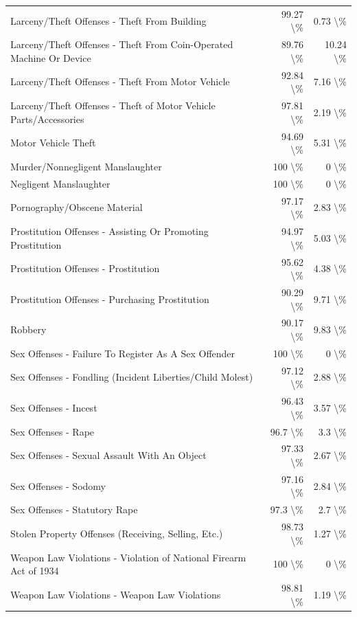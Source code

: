 \documentclass[
  12pt,
  openany]{book}
\begin{document}
\begin{longtable}[t]{lrr}
Larceny/Theft Offenses - Theft From Building & 99.27 \textbackslash{}\% & 0.73 \textbackslash{}\%\\
Larceny/Theft Offenses - Theft From Coin-Operated Machine Or Device & 89.76 \textbackslash{}\% & 10.24 \textbackslash{}\%\\
Larceny/Theft Offenses - Theft From Motor Vehicle & 92.84 \textbackslash{}\% & 7.16 \textbackslash{}\%\\
\addlinespace
Larceny/Theft Offenses - Theft of Motor Vehicle Parts/Accessories & 97.81 \textbackslash{}\% & 2.19 \textbackslash{}\%\\
Motor Vehicle Theft & 94.69 \textbackslash{}\% & 5.31 \textbackslash{}\%\\
Murder/Nonnegligent Manslaughter & 100 \textbackslash{}\% & 0 \textbackslash{}\%\\
Negligent Manslaughter & 100 \textbackslash{}\% & 0 \textbackslash{}\%\\
Pornography/Obscene Material & 97.17 \textbackslash{}\% & 2.83 \textbackslash{}\%\\
\addlinespace
Prostitution Offenses - Assisting Or Promoting Prostitution & 94.97 \textbackslash{}\% & 5.03 \textbackslash{}\%\\
Prostitution Offenses - Prostitution & 95.62 \textbackslash{}\% & 4.38 \textbackslash{}\%\\
Prostitution Offenses - Purchasing Prostitution & 90.29 \textbackslash{}\% & 9.71 \textbackslash{}\%\\
Robbery & 90.17 \textbackslash{}\% & 9.83 \textbackslash{}\%\\
Sex Offenses - Failure To Register As A Sex Offender & 100 \textbackslash{}\% & 0 \textbackslash{}\%\\
\addlinespace
Sex Offenses - Fondling (Incident Liberties/Child Molest) & 97.12 \textbackslash{}\% & 2.88 \textbackslash{}\%\\
Sex Offenses - Incest & 96.43 \textbackslash{}\% & 3.57 \textbackslash{}\%\\
Sex Offenses - Rape & 96.7 \textbackslash{}\% & 3.3 \textbackslash{}\%\\
Sex Offenses - Sexual Assault With An Object & 97.33 \textbackslash{}\% & 2.67 \textbackslash{}\%\\
Sex Offenses - Sodomy & 97.16 \textbackslash{}\% & 2.84 \textbackslash{}\%\\
\addlinespace
Sex Offenses - Statutory Rape & 97.3 \textbackslash{}\% & 2.7 \textbackslash{}\%\\
Stolen Property Offenses (Receiving, Selling, Etc.) & 98.73 \textbackslash{}\% & 1.27 \textbackslash{}\%\\
Weapon Law Violations - Violation of National Firearm Act of 1934 & 100 \textbackslash{}\% & 0 \textbackslash{}\%\\
Weapon Law Violations - Weapon Law Violations & 98.81 \textbackslash{}\% & 1.19 \textbackslash{}\%\\
\bottomrule
\end{longtable}
\end{document}
